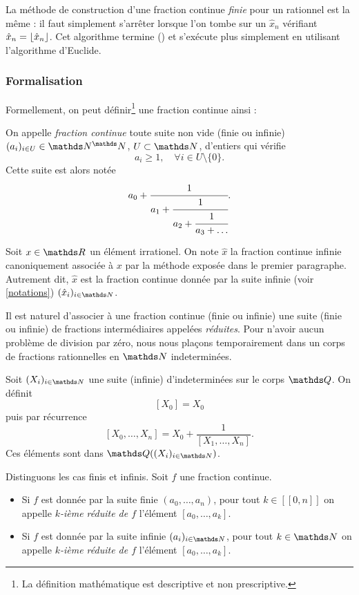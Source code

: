 \begin{remarque}
	La méthode de construction d'une fraction continue \emph{finie} pour un
	rationnel est la même : il faut simplement s'arrêter lorsque l'on tombe sur
	un $\hat{x}_n$ vérifiant $\hat{x}_n = \lfloor\hat{x}_n\rfloor$. Cet algorithme
	termine (\cite{wikiu}) et s'exécute plus simplement en utilisant l'algorithme
	d'Euclide.
\end{remarque}

\subsubsection{Formalisation}

Formellement, on peut définir\footnote{La définition mathématique est
descriptive et non prescriptive.} une fraction continue ainsi :

\begin{definition}\label{def-fracont}
	On appelle \emph{fraction continue} toute suite non vide (finie ou infinie)
	$(a_i)_{i\in U} \in \N^\N$, $U\subset \N$, d'entiers qui vérifie \[a_i
	\geq 1, \quad \forall i\in U\setminus\{0\}.\] Cette suite est alors notée
	\[a_0 + \cfrac{1}{a_1 + \cfrac{1}{a_2 + \cfrac{1}{a_3 + \dots}}}.\]
\end{definition}

\begin{notation}
	Soit $x\in \R$ un élément irrationel. On note $\hat{x}$ la fraction
	continue infinie canoniquement associée à $x$ par la méthode exposée dans
	le premier paragraphe. Autrement dit, $\hat{x}$ est la fraction continue
	donnée par la suite infinie (voir \ref{notations}) $(\hat{x}_i)_{i\in
	\N}$.
\end{notation}

Il est naturel d'associer à une fraction continue (finie ou infinie) une suite
(finie ou infinie) de fractions \og intermédiaires \fg{} appelées
\emph{réduites}. Pour n'avoir aucun problème de division par zéro, nous nous
plaçons temporairement dans un corps de fractions rationnelles en $\N$
indeterminées.

\begin{definition}
	Soit $(X_i)_{i\in \N}$ une suite (infinie) d'indeterminées sur le corps
	$\Q$. On définit \[[X_0] = X_0\] puis par récurrence \[[X_0, \dots,
	X_n] = X_0 + \frac{1}{[X_1, \dots, X_n]}.\] Ces éléments sont dans
	$\Q((X_i)_{i\in \N})$.
\end{definition}

\begin{definition}
	Distinguons les cas finis et infinis. Soit $f$ une fraction
	continue.
	\begin{itemize}
		\item Si $f$ est donnée par la suite finie $(a_0, \dots, a_n)$, pour
		tout $k\in [\![0, n]\!]$ on appelle \emph{$k$-ième réduite de $f$}
		l'élément $[a_0, \dots, a_k]$.
		\item Si $f$ est donnée par la suite infinie $(a_i)_{i\in \N}$, pour
		tout $k\in \N$ on appelle \emph{$k$-ième réduite de $f$} l'élément
		$[a_0, \dots, a_k]$.
	\end{itemize}
\end{definition}

